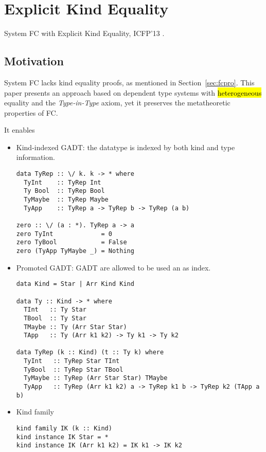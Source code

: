 \section{Explicit Kind Equality}

System FC with Explicit Kind Equality, ICFP'13 \citep{weirich2013system}.

\subsection{Motivation}

System FC lacks kind equality proofs, as mentioned in Section~\ref{sec:fcpro}.
This paper presents an approach based on dependent type systems with
\hl{heterogeneous} equality and the \textit{Type-in-Type} axiom, yet it
preserves the metatheoretic properties of FC.

It enables

\begin{itemize}
\item Kind-indexed GADT: the datatype is indexed by both kind and type information.
  \begin{verbatim}
data TyRep :: \/ k. k -> * where
  TyInt    :: TyRep Int
  Ty Bool  :: TyRep Bool
  TyMaybe  :: TyRep Maybe
  TyApp    :: TyRep a -> TyRep b -> TyRep (a b)

zero :: \/ (a : *). TyRep a -> a
zero TyInt             = 0
zero TyBool            = False
zero (TyApp TyMaybe _) = Nothing
  \end{verbatim}
\item Promoted GADT: GADT are allowed to be used an as index.
  \begin{verbatim}
data Kind = Star | Arr Kind Kind

data Ty :: Kind -> * where
  TInt   :: Ty Star
  TBool  :: Ty Star
  TMaybe :: Ty (Arr Star Star)
  TApp   :: Ty (Arr k1 k2) -> Ty k1 -> Ty k2

data TyRep (k :: Kind) (t :: Ty k) where
  TyInt   :: TyRep Star TInt
  TyBool  :: TyRep Star TBool
  TyMaybe :: TyRep (Arr Star Star) TMaybe
  TyApp   :: TyRep (Arr k1 k2) a -> TyRep k1 b -> TyRep k2 (TApp a b)
  \end{verbatim}
\item Kind family
  \begin{verbatim}
kind family IK (k :: Kind)
kind instance IK Star = *
kind instance IK (Arr k1 k2) = IK k1 -> IK k2
  \end{verbatim}
\end{itemize}

